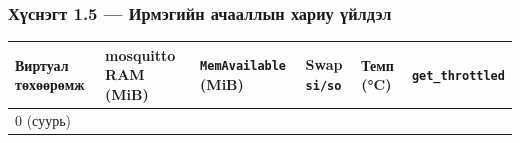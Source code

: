 \hypertarget{ux445ux4afux441ux43dux44dux433ux442-1.5-ux438ux440ux43cux44dux433ux438ux439ux43d-ux430ux447ux430ux430ux43bux43bux44bux43d-ux445ux430ux440ux438ux443-ux4afux439ux43bux434ux44dux43b}{%
\subsubsection{Хүснэгт 1.5 --- Ирмэгийн ачааллын хариу үйлдэл}\label{ux445ux4afux441ux43dux44dux433ux442-1.5-ux438ux440ux43cux44dux433ux438ux439ux43d-ux430ux447ux430ux430ux43bux43bux44bux43d-ux445ux430ux440ux438ux443-ux4afux439ux43bux434ux44dux43b}}

\begingroup\scriptsize\begin{longtable}[]{@{}llllll@{}}
\toprule
\begin{minipage}[b]{0.14\columnwidth}\raggedright
Виртуал төхөөрөмж\strut
\end{minipage} & \begin{minipage}[b]{0.14\columnwidth}\raggedright
mosquitto RAM (MiB)\strut
\end{minipage} & \begin{minipage}[b]{0.14\columnwidth}\raggedright
\texttt{MemAvailable} (MiB)\strut
\end{minipage} & \begin{minipage}[b]{0.14\columnwidth}\raggedright
Swap \texttt{si/so}\strut
\end{minipage} & \begin{minipage}[b]{0.14\columnwidth}\raggedright
Темп (°C)\strut
\end{minipage} & \begin{minipage}[b]{0.14\columnwidth}\raggedright
\texttt{get\_throttled}\strut
\end{minipage}\tabularnewline
\midrule
\endhead
\begin{minipage}[t]{0.14\columnwidth}\raggedright
0 (суурь)\strut
\end{minipage} & \begin{minipage}[t]{0.14\columnwidth}\raggedright
\strut
\end{minipage} & \begin{minipage}[t]{0.14\columnwidth}\raggedright
\strut
\end{minipage} & \begin{minipage}[t]{0.14\columnwidth}\raggedright
\strut
\end{minipage} & \begin{minipage}[t]{0.14\columnwidth}\raggedright
\strut
\end{minipage} & \begin{minipage}[t]{0.14\columnwidth}\raggedright

\end{minipage}
\end{longtable}
